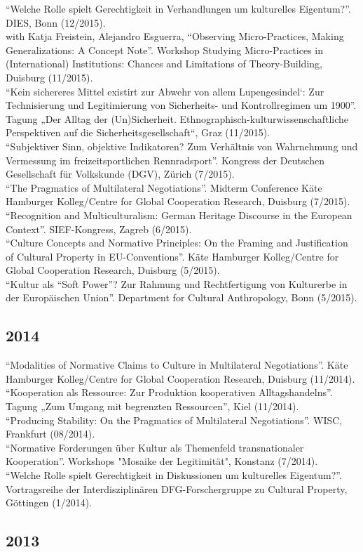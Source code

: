 \enquote{Welche Rolle spielt Gerechtigkeit in Verhandlungen um kulturelles Eigentum?}. DIES, Bonn (12/2015).\\[.25cm]with Katja Freistein, Alejandro Esguerra, \enquote{Observing Micro-Practices, Making Generalizations: A Concept Note}. Workshop Studying Micro-Practices in (International) Institutions: Chances and Limitations of Theory-Building, Duisburg (11/2015).\\[.25cm]\enquote{Kein sichereres Mittel existirt zur Abwehr von allem Lupengesindel‘: Zur Technisierung und Legitimierung von Sicherheits- und Kontrollregimen um 1900}. Tagung „Der Alltag der (Un)Sicherheit. Ethnographisch-kulturwissenschaftliche Perspektiven auf die Sicherheitsgesellschaft“, Graz (11/2015).\\[.25cm]\enquote{Subjektiver Sinn, objektive Indikatoren? Zum Verhältnis von Wahrnehmung und Vermessung im freizeitsportlichen Rennradsport}. Kongress der Deutschen Gesellschaft für Volkskunde (DGV), Zürich (7/2015).\\[.25cm]\enquote{The Pragmatics of Multilateral Negotiations}. Midterm Conference Käte Hamburger Kolleg/Centre for Global Cooperation Research, Duisburg (7/2015).\\[.25cm]\enquote{Recognition and Multiculturalism: German Heritage Discourse in the European Context}. SIEF-Kongress, Zagreb (6/2015).\\[.25cm]\enquote{Culture Concepts and Normative Principles: On the Framing and Justification of Cultural Property in EU-Conventions}. Käte Hamburger Kolleg/Centre for Global Cooperation Research, Duisburg (5/2015).\\[.25cm]\enquote{Kultur als “Soft Power”? Zur Rahmung und Rechtfertigung von Kulturerbe in der Europäischen Union}. Department for Cultural Anthropology, Bonn (5/2015).\subsection*{2014}
\enquote{Modalities of Normative Claims to Culture in Multilateral Negotiations}. Käte Hamburger Kolleg/Centre for Global Cooperation Research, Duisburg (11/2014).\\[.25cm]\enquote{Kooperation als Ressource: Zur Produktion kooperativen Alltagshandelns}. Tagung „Zum Umgang mit begrenzten Ressourcen”, Kiel (11/2014).\\[.25cm]\enquote{Producing Stability: On the Pragmatics of Multilateral Negotiations}. WISC, Frankfurt (08/2014).\\[.25cm]\enquote{Normative Forderungen über Kultur als Themenfeld transnationaler Kooperation}. Workshops "Mosaike der Legitimität", Konstanz (7/2014).\\[.25cm]\enquote{Welche Rolle spielt Gerechtigkeit in Diskussionen um kulturelles Eigentum?}. Vortragsreihe der Interdisziplinären DFG-Forschergruppe zu Cultural Property, Göttingen (1/2014).\subsection*{2013}
